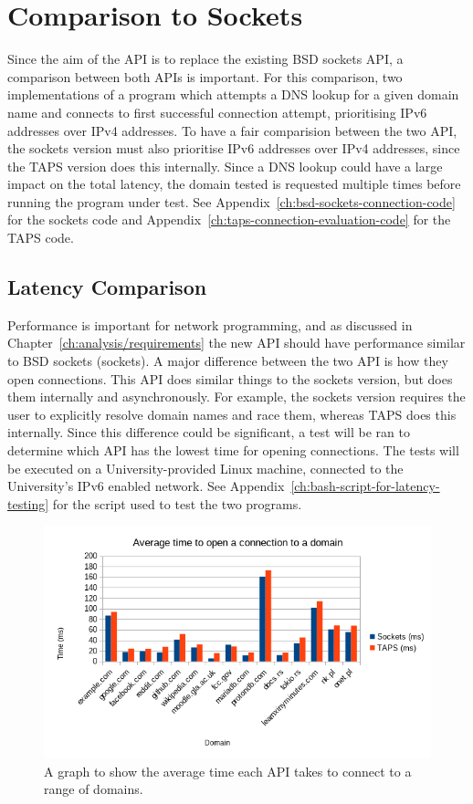 \section{Comparison to Sockets}\label{sec:comparison-to-sockets}
Since the aim of the API is to replace the existing BSD sockets API, a comparison between both APIs is important.
For this comparison, two implementations of a program which attempts a DNS lookup for a given domain name and connects
to first successful connection attempt, prioritising IPv6 addresses over IPv4 addresses.
To have a fair comparision between the two API, the sockets version must also prioritise IPv6 addresses over IPv4
addresses, since the TAPS version does this internally.
Since a DNS lookup could have a large impact on the total latency, the domain tested is requested multiple times before
running the program under test.
See Appendix~\ref{ch:bsd-sockets-connection-code} for the sockets code and Appendix~\ref{ch:taps-connection-evaluation-code}
for the TAPS code.

\subsection{Latency Comparison}\label{subsec:latency-comparison}
Performance is important for network programming, and as discussed in Chapter~\ref{ch:analysis/requirements} the new
API should have performance similar to BSD sockets (sockets).
A major difference between the two API is how they open connections.
This API does similar things to the sockets version, but does them internally and asynchronously.
For example, the sockets version requires the user to explicitly resolve domain names and race them, whereas TAPS
does this internally.
Since this difference could be significant, a test will be ran to determine which API has the lowest time for opening
connections.
The tests will be executed on a University-provided Linux machine, connected to the University's IPv6 enabled network.
See Appendix~\ref{ch:bash-script-for-latency-testing} for the script used to test the two programs.

\begin{figure}[h]
    \includegraphics[width=\textwidth]{../data/processed/avg_latency}
    \caption{A graph to show the average time each API takes to connect to a range of domains.}
    \label{fig:latency}
\end{figure}


